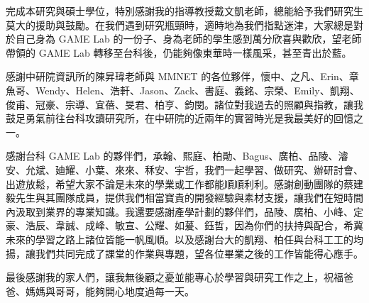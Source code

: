 完成本研究與碩士學位，特別感謝我的指導教授戴文凱老師，總能給予我們研究生莫大的援助與鼓勵。在我們遇到研究瓶頸時，適時地為我們指點迷津，大家總是對於自己身為 GAME Lab 的一份子、身為老師的學生感到萬分欣喜與歡欣，望老師帶領的 GAME Lab 轉移至台科後，仍能夠像東華時一樣風采，甚至青出於藍。

感謝中研院資訊所的陳昇瑋老師與 MMNET 的各位夥伴，懷中、之凡、Erin、章魚哥、Wendy、Helen、浩軒、Jason、Zack、書庭、義銘、宗榮、Emily、凱翔、俊甫、冠豪、宗導、宜蓓、旻君、柏亨、鈞閔。諸位對我過去的照顧與指教，讓我鼓足勇氣前往台科攻讀研究所，在中研院的近兩年的實習時光是我最美好的回憶之一。

感謝台科 GAME Lab 的夥伴們，承翰、熙庭、柏勛、Bagus、廣柏、品陵、濬安、允斌、廸耀、小葉、來來、秝安、宇哲，我們一起學習、做研究、辦研討會、出遊放鬆，希望大家不論是未來的學業或工作都能順順利利。感謝創動團隊的蔡建毅先生與其團隊成員，提供我們相當寶貴的開發經驗與素材支援，讓我們在短時間內汲取到業界的專業知識。我還要感謝產學計劃的夥伴們，品陵、廣柏、小峰、定豪、浩辰、韋誠、成峰、敏宣、公耀、如萲、鈺哲，因為你們的扶持與配合，希冀未來的學習之路上諸位皆能一帆風順。以及感謝台大的凱翔、柏任與台科工工的均揚，讓我們共同完成了課堂的作業與專題，望各位畢業之後的工作皆能得心應手。

最後感謝我的家人們，讓我無後顧之憂並能專心於學習與研究工作之上，祝福爸爸、媽媽與哥哥，能夠開心地度過每一天。